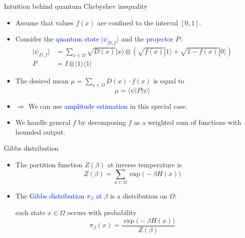 \documentclass{beamer}
\renewcommand{\>}{\rangle}
\newcommand{\<}{\langle}
\begin{document}
\begin{frame}{Intuition behind quantum Chebyshev inequality}
\begin{itemize}
    \item Assume that values $f(x)$ are confined to the interval $[0, 1]$.
    
    \medskip
    \item Consider the \textcolor{blue}{quantum state $|\psi_{D,f}\>$} and the \textcolor{blue}{projector $P$}:
    \begin{align*}
        |\psi_{D,f}\> &= \sum_{x\in\Omega} \sqrt{D(x)} |x\> \otimes \left(
        \sqrt{f(x)} |1\> + \sqrt{1-f(x)} |0\> 
        \right) \\
        P &= I \otimes |1\>\<1|
    \end{align*}
    
    \medskip
    \item The desired mean $\mu=\sum_{x\in\Omega} D(x) \cdot f(x)$ is equal to
    \begin{equation*}
        \mu = \<\psi|P|\psi\>
    \end{equation*}
    
    \medskip
    \item $\Longrightarrow$ We can use \textcolor{blue}{amplitude estimation} in this special case.
    
    \medskip
    \item We handle general $f$ by decomposing $f$ as a weighted sum of functions with bounded output.
\end{itemize}
\end{frame}

%

\begin{frame}{Gibbs distribution}
    \begin{itemize}
        \item The partition function $Z(\beta)$ at inverse temperature is 
        \begin{equation*}
            Z(\beta) = \sum_{x\in\Omega} \exp\big( -\beta H(x) \big)
        \end{equation*}

        \item The \textcolor{blue}{Gibbs distribution $\pi_\beta$ at $\beta$} is a distribution on $\Omega$: 
        
        \medskip
        each state $x\in\Omega$ occurs with probability
        \begin{equation*}
            \pi_\beta(x) = \frac{\exp\big(-\beta H(x)\big)}{Z(\beta)}
        \end{equation*}

    \end{itemize}
\end{frame}
\end{document}
